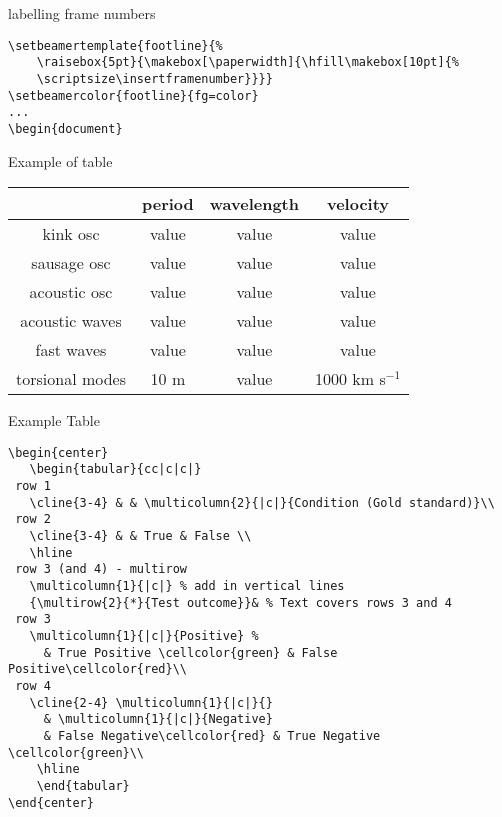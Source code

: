 \documentclass[9pt]{beamer}
\begin{document}
\begin{frame}[fragile=singleslide]{labelling frame numbers}
    \begin{verbatim}
\setbeamertemplate{footline}{%
    \raisebox{5pt}{\makebox[\paperwidth]{\hfill\makebox[10pt]{%
    \scriptsize\insertframenumber}}}}
\setbeamercolor{footline}{fg=color}
...
\begin{document}
    \end{verbatim}
\end{frame}%
\begin{frame}{Example of table}
    \begin{center}
        \begin{tabular}{c|c|c|c|}
            \cline{2-4} & {\textbf{period}} & {\textbf{wavelength}} &
                {\textbf{velocity}}\\
            \hline \multicolumn{0}{|c|}{kink osc} & value & value & value\\
            \hline \multicolumn{0}{|c|}{sausage osc} & value & value & value\\
            \hline \multicolumn{0}{|c|}{acoustic osc} & value & value & value\\
            \hline \multicolumn{0}{|c|}{acoustic waves} & value & value & value\\
            \hline \multicolumn{0}{|c|}{fast waves} & value & value & value\\
            \hline \multicolumn{0}{|c|}{torsional modes} & 10 m & value &
                1000 km s$^{-1}$\\
            \hline
        \end{tabular}
    \end{center}
\end{frame}%
\begin{frame}{Example Table}
    \begin{verbatim}
\begin{center}
   \begin{tabular}{cc|c|c|}
 row 1
   \cline{3-4} & & \multicolumn{2}{|c|}{Condition (Gold standard)}\\
 row 2
   \cline{3-4} & & True & False \\
   \hline
 row 3 (and 4) - multirow
   \multicolumn{1}{|c|} % add in vertical lines
   {\multirow{2}{*}{Test outcome}}& % Text covers rows 3 and 4
 row 3
   \multicolumn{1}{|c|}{Positive} %
     & True Positive \cellcolor{green} & False Positive\cellcolor{red}\\
 row 4
   \cline{2-4} \multicolumn{1}{|c|}{}
     & \multicolumn{1}{|c|}{Negative}
     & False Negative\cellcolor{red} & True Negative \cellcolor{green}\\
    \hline
    \end{tabular}
\end{center}
    \end{verbatim}
\end{frame}%
\end{document}
